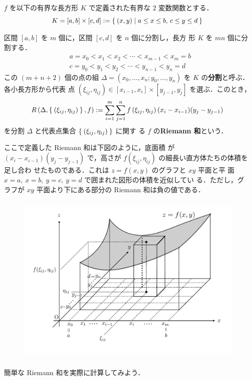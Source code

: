\documentclass[10pt, uplatex, dvipdfmx]{jsarticle}
\theoremstyle{definition}
\numberwithin{equation}{section}
\begin{document}
$f$ を以下の有界な長方形 $K$ で定義された有界な $2$ 変数関数とする．
\[
  K=[a,b] \times [c,d] :=\Set{(x,y) | a \leq x \leq b, \, c \leq y \leq d}
\]

区間 $[a,b]$ を $m$ 個に，区間 $[c,d]$ を $n$ 個に分割し，長方
形 $K$ を $mn$ 個に分割する．
\begin{align*}
  & a=x_0 < x_1 < x_2 < \cdots < x_{m-1} < x_{m}=b\\
  & c=y_0 < y_1 < y_2 < \cdots < y_{n-1} < y_{n} =d
\end{align*}
この $(m+n+2)$ 個の点の組
$\Delta=\left( x_0, \ldots, x_n; y_0, \ldots,
  y_n\right)$ を $K$ の\textbf{分割}と呼ぶ．各小長方形から代表
点
$\left( \xi_{ij}, \eta_{ij}\right) \in [x_{i-1}, x_{i}] \times
[y_{j-1}, y_{j}]$ を選ぶ．このとき，
\[
  R\left( \Delta, \Set{(\xi_{ij}, \eta_{ij})}, f\right) 
  := \sum_{i=1}^{m} \sum_{j=1}^{n} f\left( \xi_{ij}, \eta_{ij}\right)(x_{i}-x_{i-1})(y_{j}-y_{j-1})
\]
を分割 $\Delta$ と代表点集合 $\Set{(\xi_{ij}, \eta_{ij})}$ に関す
る $f$ の\textbf{Riemann 和}という．

ここで定義した Riemann 和は下図のように，底面積
が $(x_{i}-x_{i-1})(y_{j}-y_{j-1})$ で，高さが
$f\left( \xi_{ij}, \eta_{ij}\right)$ の細長い直方体たちの体積を足し合わ
せたものである．これは $z=f(x,y)$ のグラフと $xy$ 平面と平
面 $x=a, \ x=b, \ y=c, \ y=d$ で囲まれた図形の体積を近似してい
る．ただし，グラフが $xy$ 平面より下にある部分の Riemann 和は負の値である．
\begin{figure}[h]
  \centering
  \includegraphics[height=8.5cm]{./pictures/07/box.pdf}
\end{figure}

\newpage

簡単な Riemann 和を実際に計算してみよう．
\end{document}
